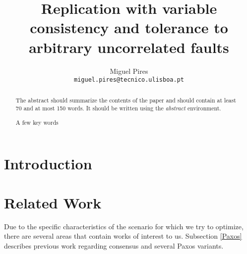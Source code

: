 \documentclass[runningheads,a4paper]{llncs}
\newcommand{\keywords}[1]{\par\addvspace\baselineskip
\noindent\keywordname\enspace\ignorespaces#1}
\begin{document}
\mainmatter  %

\title{Replication with variable consistency and tolerance to arbitrary uncorrelated faults}


\author{Miguel Pires \\
\texttt{miguel.pires@tecnico.ulisboa.pt}}



%
%

\maketitle


\begin{abstract}
The abstract should summarize the contents of the paper and should
contain at least 70 and at most 150 words. It should be written using the
\emph{abstract} environment.
\keywords{A few key words}
\end{abstract}

\section{Introduction}

\section{Related Work}

Due to the specific characteristics of the scenario for which we try to optimize, there are several areas that contain works of interest to us. Subsection \ref{Paxos} describes previous work regarding consensus and several Paxos variants. 
\end{document}
